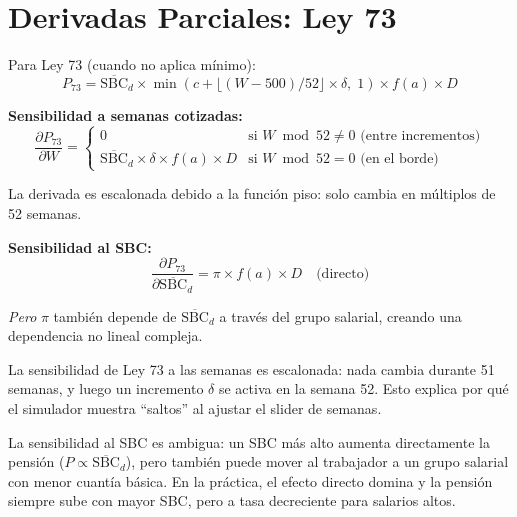 \documentclass[11pt,a4paper]{report}
\theoremstyle{remark}
\begin{document}
\section{Derivadas Parciales: Ley 73}

\begin{tcolorbox}[colback=blue!5!white, colframe=blue!75!black, title=\textbf{Definici\'on Formal}]
Para Ley 73 (cuando no aplica m\'inimo):
\begin{equation}
P_{73} = \overline{\text{SBC}}_d \times \min(c + \lfloor (W-500)/52 \rfloor \times \delta, \; 1) \times f(a) \times D
\end{equation}

\textbf{Sensibilidad a semanas cotizadas:}
\begin{equation}
\frac{\partial P_{73}}{\partial W} = \begin{cases}
0 & \text{si } W \bmod 52 \neq 0 \text{ (entre incrementos)} \\
\overline{\text{SBC}}_d \times \delta \times f(a) \times D & \text{si } W \bmod 52 = 0 \text{ (en el borde)}
\end{cases}
\end{equation}

La derivada es escalonada debido a la funci\'on piso: solo cambia en m\'ultiplos de 52 semanas.

\textbf{Sensibilidad al SBC:}
\begin{equation}
\frac{\partial P_{73}}{\partial \overline{\text{SBC}}_d} = \pi \times f(a) \times D \quad \text{(directo)}
\end{equation}

\textit{Pero} $\pi$ tambi\'en depende de $\overline{\text{SBC}}_d$ a trav\'es del grupo salarial, creando una dependencia no lineal compleja.
\end{tcolorbox}

\begin{tcolorbox}[colback=green!5!white, colframe=green!50!black, title=\textbf{Intuici\'on}]
La sensibilidad de Ley 73 a las semanas es escalonada: nada cambia durante 51 semanas, y luego un incremento $\delta$ se activa en la semana 52. Esto explica por qu\'e el simulador muestra ``saltos'' al ajustar el slider de semanas.

La sensibilidad al SBC es ambigua: un SBC m\'as alto aumenta directamente la pensi\'on ($P \propto \overline{\text{SBC}}_d$), pero tambi\'en puede mover al trabajador a un grupo salarial con menor cuant\'ia b\'asica. En la pr\'actica, el efecto directo domina y la pensi\'on siempre sube con mayor SBC, pero a tasa decreciente para salarios altos.
\end{tcolorbox}
\end{document}
